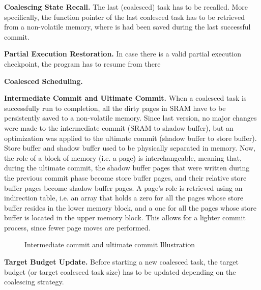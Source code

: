 \noindent \textbf{Coalescing State Recall.} The last (coalesced) task has to be recalled. More specifically, the function pointer of the last coalesced task has to be retrieved from a non-volatile memory, where is had been saved during the last successful commit. 

\noindent \textbf{Partial Execution Restoration.} In case there is a valid partial execution checkpoint, the program has to resume from there 

\noindent \textbf{Coalesced Scheduling.} 

\noindent \textbf{Intermediate Commit and Ultimate Commit.} When a coalesced task is successfully run to completion, all the dirty pages in SRAM have to be persistently saved to a non-volatile memory. Since last version, no major changes were made to the intermediate commit (SRAM to shadow buffer), but an optimization was applied to the ultimate commit (shadow buffer to store buffer). Store buffer and shadow buffer used to be physically separated in memory. Now, the role of a block of memory (i.e. a page) is interchangeable, meaning that, during the ultimate commit, the shadow buffer pages that were written during the previous commit phase become store buffer pages, and their relative store buffer pages become shadow buffer pages. A page’s role is retrieved using an indirection table, i.e. an array that holds a zero for all the pages whose store buffer resides in the lower memory block, and a one for all the pages whose store buffer is located in the upper memory block. This allows for a lighter commit process, since fewer page moves are performed.

\begin{figure}
	\centering
	\caption{Intermediate commit and ultimate commit Illustration }
	\label{fig:intermediate_ultimate-commit}
\end{figure}

\noindent \textbf{Target Budget Update.} Before starting a new coalesced task, the target budget (or target coalesced task size) has to be updated depending on the coalescing strategy. 

